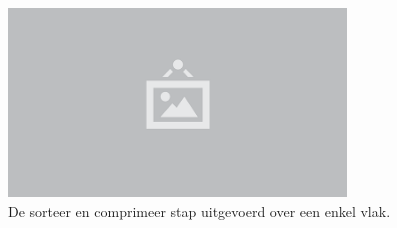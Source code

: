 \begin{figure}
  \centering
  \includegraphics[width=0.8\textwidth]{./img/raw/placeholder.png}
  \caption{De sorteer en comprimeer stap uitgevoerd over een enkel vlak.}
  \label{fig:cs-sort-and-compact}
\end{figure}
